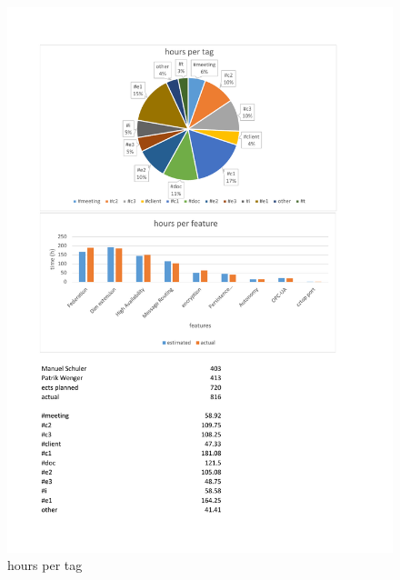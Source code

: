 \begin{figure}[]
	\includegraphics[trim=4cm 18.8cm 3.5cm 2.8cm, clip=true, width=\textwidth]{img/project_monitoring_diagrams.pdf}
	\caption{hours per tag}
	\label{fig:hours:per:tag}
\end{figure}


